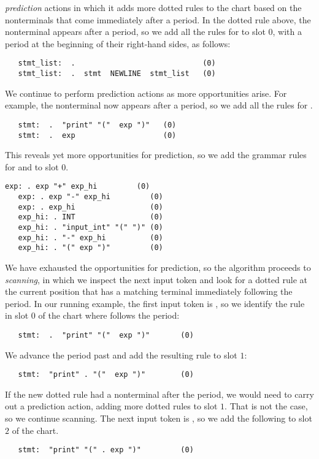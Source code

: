 \documentclass[7x10]{TimesAPriori_MIT}%
\numberwithin{theorem}{chapter}
\numberwithin{definition}{chapter}
\numberwithin{equation}{chapter}
\begin{document}
{\emph{prediction} actions in which it adds more dotted rules to the
chart based on the nonterminals that come immediately after a period. In
the dotted rule above, the nonterminal  appears after a period,
so we add all the rules for  to slot $0$, with a
period at the beginning of their right-hand sides, as follows:
\begin{lstlisting}
   stmt_list:  .                             (0)
   stmt_list:  .  stmt  NEWLINE  stmt_list   (0)
\end{lstlisting}
We continue to perform prediction actions as more opportunities
arise. For example, the  nonterminal now appears after a
period, so we add all the rules for .
\begin{lstlisting}
   stmt:  .  "print" "("  exp ")"   (0)
   stmt:  .  exp                    (0)
\end{lstlisting}
This reveals yet more opportunities for prediction, so we add the grammar
rules for  and  to slot $0$.
\begin{lstlisting}[escapechar=$]
   exp: . exp "+" exp_hi         (0)
   exp: . exp "-" exp_hi         (0)
   exp: . exp_hi                 (0)
   exp_hi: . INT                 (0)
   exp_hi: . "input_int" "(" ")" (0)
   exp_hi: . "-" exp_hi          (0)
   exp_hi: . "(" exp ")"         (0)
\end{lstlisting}

We have exhausted the opportunities for prediction, so the algorithm
proceeds to \emph{scanning}, in which we inspect the next input token
and look for a dotted rule at the current position that has a matching
terminal immediately following the period. In our running example, the
first input token is , so we identify the rule in slot
$0$ of the chart where  follows the period:
\begin{lstlisting}
   stmt:  .  "print" "("  exp ")"       (0)
\end{lstlisting}
We advance the period past  and add the resulting rule
to slot $1$:
\begin{lstlisting}
   stmt:  "print" . "("  exp ")"        (0)
\end{lstlisting}
If the new dotted rule had a nonterminal after the period, we would
need to carry out a prediction action, adding more dotted rules to
slot $1$. That is not the case, so we continue scanning. The next
input token is , so we add the following to slot $2$ of the
chart.
\begin{lstlisting}
   stmt:  "print" "(" . exp ")"         (0)
\end{lstlisting}

}
\end{document}
